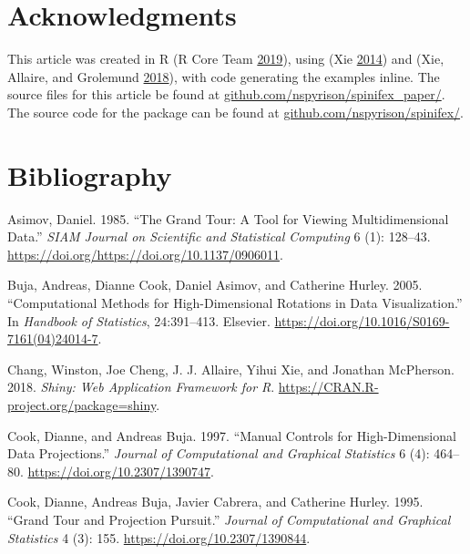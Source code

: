 \hypertarget{acknowledgments}{%
\section{Acknowledgments}\label{acknowledgments}}

This article was created in R (R Core Team
\protect\hyperlink{ref-r_core_team_r:_2019}{2019}), using
 (Xie \protect\hyperlink{ref-stodden_knitr:_2014}{2014})
and  (Xie, Allaire, and Grolemund
\protect\hyperlink{ref-xie_r_2018}{2018}), with code generating the
examples inline. The source files for this article be found at
\href{https://github.com/nspyrison/spinifex_paper/}{github.com/nspyrison/spinifex\_paper/}.
The source code for the  package can be found at
\href{https://github.com/nspyrison/spinifex/}{github.com/nspyrison/spinifex/}.

\hypertarget{bibliography}{%
\section*{Bibliography}\label{bibliography}}

\hypertarget{refs}{}
\leavevmode\hypertarget{ref-asimov_grand_1985}{}%
Asimov, Daniel. 1985. ``The Grand Tour: A Tool for Viewing
Multidimensional Data.'' \emph{SIAM Journal on Scientific and
Statistical Computing} 6 (1): 128--43.
\url{https://doi.org/https://doi.org/10.1137/0906011}.

\leavevmode\hypertarget{ref-buja_computational_2005}{}%
Buja, Andreas, Dianne Cook, Daniel Asimov, and Catherine Hurley. 2005.
``Computational Methods for High-Dimensional Rotations in Data
Visualization.'' In \emph{Handbook of Statistics}, 24:391--413.
Elsevier. \url{https://doi.org/10.1016/S0169-7161(04)24014-7}.

\leavevmode\hypertarget{ref-chang_shiny:_2018}{}%
Chang, Winston, Joe Cheng, J. J. Allaire, Yihui Xie, and Jonathan
McPherson. 2018. \emph{Shiny: Web Application Framework for R}.
\url{https://CRAN.R-project.org/package=shiny}.

\leavevmode\hypertarget{ref-cook_manual_1997}{}%
Cook, Dianne, and Andreas Buja. 1997. ``Manual Controls for
High-Dimensional Data Projections.'' \emph{Journal of Computational and
Graphical Statistics} 6 (4): 464--80.
\url{https://doi.org/10.2307/1390747}.

\leavevmode\hypertarget{ref-cook_grand_1995}{}%
Cook, Dianne, Andreas Buja, Javier Cabrera, and Catherine Hurley. 1995.
``Grand Tour and Projection Pursuit.'' \emph{Journal of Computational
and Graphical Statistics} 4 (3): 155.
\url{https://doi.org/10.2307/1390844}.

